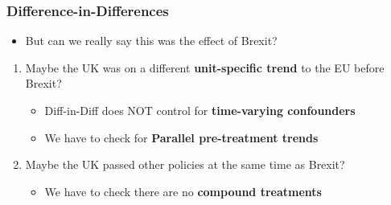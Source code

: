 \documentclass[xcolor=x11names,compress]{beamer}\usepackage[]{graphicx}\usepackage[]{color}
\renewcommand{\(}{\begin{columns}}
\renewcommand{\)}{\end{columns}}
\newcommand{\<}[1]{\begin{column}{#1}}
\renewcommand{\>}{\end{column}}
\begin{document}
\begin{frame}
\frametitle{Difference-in-Differences}
\begin{itemize}
\item But can we really say this was the effect of Brexit?
\end{itemize}
\pause
\begin{enumerate}
\item Maybe the UK was on a different \textbf{unit-specific trend} to the EU before Brexit?
\pause
\begin{itemize}
\item Diff-in-Diff does NOT control for \textbf{time-varying confounders}
\pause
\item We have to check for \textbf{Parallel pre-treatment trends}
\end{itemize}
\item Maybe the UK passed other policies at the same time as Brexit?
\pause
\begin{itemize}
\item We have to check there are no \textbf{compound treatments}
\end{itemize}
\end{enumerate}
\end{frame}
\end{document}
